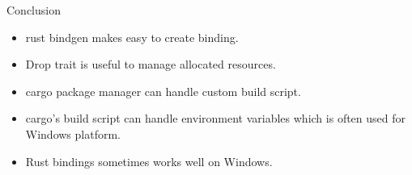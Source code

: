 \documentclass[12pt, unicode]{beamer}
\begin{document}

\begin{frame}{Conclusion}
  \begin{itemize}
  \item rust bindgen makes easy to create binding.
  \item Drop trait is useful to manage allocated resources.
  \item cargo package manager can handle custom build script.
  \item cargo's build script can handle environment variables which is often used for Windows platform.
  \item Rust bindings sometimes works well on Windows.
  \end{itemize}
\end{frame}

\end{document}
